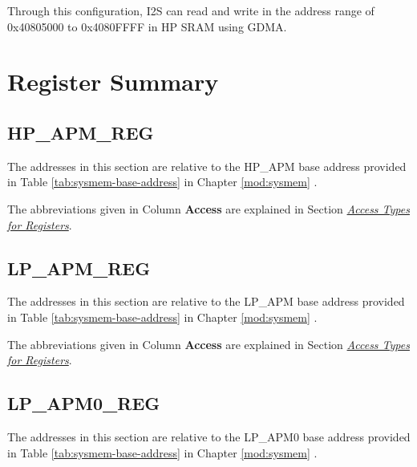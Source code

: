 \documentclass[main\_\_EN.tex]{subfiles}
\begin{document}
Through this configuration, I2S can read and write in the address range of 0x40805000 to 0x4080FFFF in HP SRAM using GDMA.



\hypertarget{permctrl-reg-summ}{}
\section{Register Summary}
\label{sec:permctrl-reg-summ}


\subsection{HP\_APM\_REG}
\label{sec:permctrl-reg-hp}

The addresses in this section are relative to the HP\_APM base address provided in Table \ref{tab:sysmem-base-address} in Chapter \ref{mod:sysmem} \textit{}.

The abbreviations given in Column \textbf{Access} are explained in Section \hyperref[glossary-access-types]{\textit{Access Types for Registers}}.



\subsection{LP\_APM\_REG}
\label{sec:permctrl-reg-lp}

The addresses in this section are relative to the LP\_APM base address provided in Table \ref{tab:sysmem-base-address} in Chapter \ref{mod:sysmem} \textit{}.

The abbreviations given in Column \textbf{Access} are explained in Section \hyperref[glossary-access-types]{\textit{Access Types for Registers}}.



\subsection{LP\_APM0\_REG}
\label{sec:permctrl-reg-lp0}

The addresses in this section are relative to the LP\_APM0 base address provided in Table \ref{tab:sysmem-base-address} in Chapter \ref{mod:sysmem} \textit{}.
\end{document}
